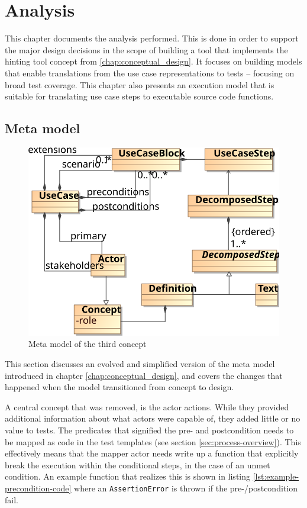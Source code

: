 \chapter{Analysis}
\label{ch:design}
This chapter documents the analysis performed. This is done in order to support the major design decisions in the scope of building a tool that implements the hinting tool concept from \ref{chap:conceptual_design}. It focuses on building models that enable translations from the use case representations to tests -- focusing on broad test coverage. This chapter also presents an execution model that is suitable for translating use case steps to executable source code functions.

\section{Meta model}
\begin{figure}[!htbp]
  \centering
  \includegraphics[scale=0.9]{img/3rd_iteration_meta_model}
  \caption{Meta model of the third concept}
  \label{fig:3rd_iteration_meta_model}
\end{figure}
\noindent This section discusses an evolved and simplified version of the meta model introduced in chapter \ref{chap:conceptual_design}, and covers the changes that happened when the model transitioned from concept to design.\medskip

\noindent A central concept that was removed, is the actor actions. While they provided additional information about what actors were capable of, they added little or no value to tests. The predicates that signified the pre- and postcondition needs to be mapped as code in the test templates (see section \ref{sec:process-overview}). This effectively means that the mapper actor needs write up a function that explicitly break the execution within the conditional steps, in the case of an unmet condition. An example function that realizes this is shown in listing \ref{lst:example-precondition-code} where an \texttt{AssertionError} is thrown if the pre-/postcondition fail.\medskip

